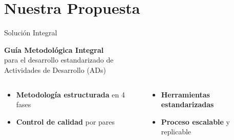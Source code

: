 \documentclass[10pt,aspectratio=169]{beamer}
\begin{document}
	
	\section{Nuestra Propuesta}
	
	\begin{frame}{Solución Integral}
		\begin{center}
			\Large
			\textcolor{azulUTQ}{\textbf{Guía Metodológica Integral}}\\
			\vspace{0.5cm}
			\normalsize
			para el desarrollo estandarizado de\\
			Actividades de Desarrollo (ADs)
		\end{center}
		
		\vspace{1cm}
		
		\begin{columns}
			\begin{column}{0.5\textwidth}
				\begin{itemize}
					\item \textbf{Metodología estructurada} en 4 fases
					\item \textbf{Control de calidad} por pares
				\end{itemize}
			\end{column}
			\begin{column}{0.5\textwidth}
				\begin{itemize}
					\item \textbf{Herramientas estandarizadas}
					\item \textbf{Proceso escalable} y replicable
				\end{itemize}
			\end{column}
		\end{columns}
	\end{frame}
	
\end{document}
